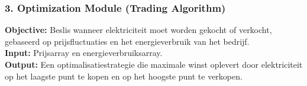 \subsubsection{3. Optimization Module (Trading Algorithm)}
\textbf{Objective:} Beslis wanneer elektriciteit moet worden gekocht of verkocht, gebaseerd op prijsfluctuaties en het energieverbruik van het bedrijf. \\
\textbf{Input:} Prijsarray en energieverbruiksarray. \\
\textbf{Output:} Een optimalisatiestrategie die maximale winst oplevert door elektriciteit op het laagste punt te kopen en op het hoogste punt te verkopen.
